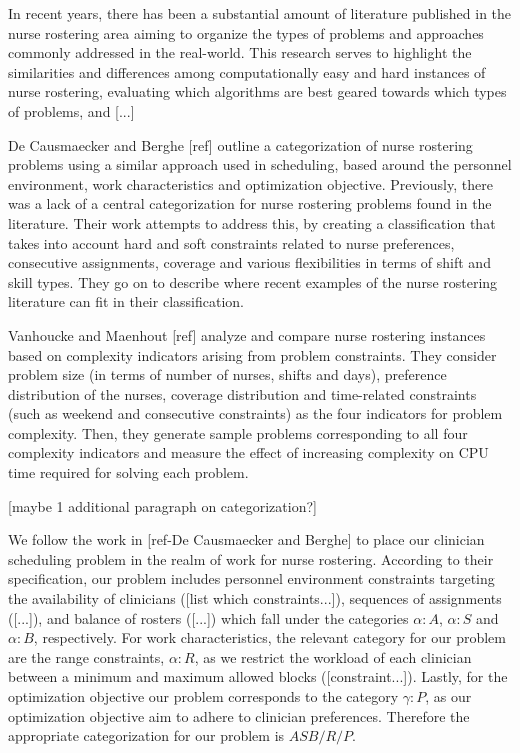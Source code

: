 In recent years, there has been a substantial amount of literature published in
the nurse rostering area aiming to organize the types of problems and approaches
commonly
addressed in the real-world. This research serves to highlight the similarities
and differences
among computationally easy and hard instances of nurse rostering, evaluating
which algorithms
are best geared towards which types of problems, and [...]

De Causmaecker and Berghe [ref] outline a categorization
of nurse rostering problems using a similar approach used in scheduling,
based around the personnel environment, work characteristics and optimization
objective. Previously, there was a lack of a central categorization for
nurse rostering problems found in the literature. Their work attempts
to address this, by creating a classification that takes into account
hard and soft constraints related to nurse preferences, consecutive 
assignments, coverage and various flexibilities in terms of shift and
skill types. They go on to describe where recent examples of the nurse rostering
literature can fit in their classification.

Vanhoucke and Maenhout [ref] analyze and compare nurse rostering instances
based on complexity indicators arising from problem constraints. They consider
problem size (in terms of number of nurses, shifts and days), preference distribution
of the nurses, coverage distribution and time-related constraints (such as weekend
and consecutive constraints) as the four indicators for problem complexity.
Then, they generate sample problems corresponding to all four complexity indicators
and measure the effect of increasing complexity on CPU time required for solving each
problem. 


[maybe 1 additional paragraph on categorization?]

We follow the work in [ref-De Causmaecker and Berghe] to place our clinician
scheduling problem
in the realm of work for nurse rostering. According to their specification, our
problem includes 
personnel environment constraints targeting the availability of clinicians
([list which constraints...]),
sequences of assignments ([...]), and balance of rosters ([...]) 
which fall under the categories $\alpha : A$, $\alpha : S$ and $\alpha : B$,
respectively. 
For work characteristics, the relevant category for our problem are the range
constraints, $\alpha : R$, 
as we restrict the workload of each clinician between a minimum and maximum
allowed blocks ([constraint...]).
Lastly, for the optimization objective our problem corresponds to the category
$\gamma : P$, as our optimization objective
aim to adhere to clinician preferences. Therefore the appropriate categorization
for our problem is $ASB/R/P$.


